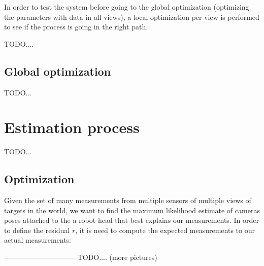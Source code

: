 In order to test the system before going to the global optimization (optimizing the parameters with data in all views), a local optimization per view is performed to see if the process is going in the right path.

TODO....



\subsection{Global optimization}

TODO...



\section{Estimation process}
\label{sec:estimation}

TODO...

%



\subsection{Optimization}


Given the set of many measurements from multiple sensors of multiple views of
targets in the world, we want to find the maximum likelihood estimate of cameras poses attached to the a robot head that best explains our measurements. In order to define the residual $r$, it is need to compute the expected measurements to our actual measurements:



------------------------------
TODO.... (more pictures)




